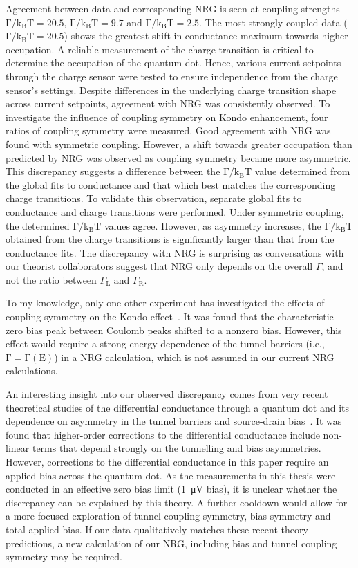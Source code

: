 Agreement between data and corresponding NRG is seen at coupling strengths $\mathrm{\Gamma/k_BT} = 20.5$, $\mathrm{\Gamma/k_BT} = 9.7$ and $\mathrm{\Gamma/k_BT} = 2.5$. The most strongly coupled data ($\mathrm{\Gamma/k_BT} = 20.5$) shows the greatest shift in conductance maximum towards higher occupation. 
A reliable measurement of the charge transition is critical to determine the occupation of the quantum dot. 
Hence, various current setpoints through the charge sensor were tested to ensure independence from the charge sensor's settings.
Despite differences in the underlying charge transition shape across current setpoints, agreement with NRG was consistently observed.
To investigate the influence of coupling symmetry on Kondo enhancement, four ratios of coupling symmetry were measured.
Good agreement with NRG was found with symmetric coupling. 
However, a shift towards greater occupation than predicted by NRG was observed as coupling symmetry became more asymmetric.
This discrepancy suggests a difference between the $\mathrm{\Gamma/k_BT}$ value determined from the global fits to conductance and that which best matches the corresponding charge transitions. 
To validate this observation, separate global fits to conductance and charge transitions were performed. Under symmetric coupling, the determined $\mathrm{\Gamma/k_BT}$ values agree. However, as asymmetry increases, the $\mathrm{\Gamma/k_BT}$ obtained from the charge transitions is significantly larger than that from the conductance fits.
The discrepancy with NRG is surprising as conversations with our theorist collaborators suggest that NRG only depends on the overall $\Gamma$, and not the ratio between $\Gamma_\mathrm{L}$ and $\Gamma_\mathrm{R}$.

To my knowledge, only one other experiment has investigated the effects of coupling symmetry on the Kondo effect~\cite{kondo_asymmetric}. 
It was found that the characteristic zero bias peak between Coulomb peaks shifted to a nonzero bias. However, this effect would require a strong energy dependence of the tunnel barriers (i.e., $\mathrm{\Gamma = \Gamma(E)}$) in a NRG calculation, which is not assumed in our current NRG calculations.

An interesting insight into our observed discrepancy comes from very recent theoretical studies of the differential conductance through a quantum dot and its dependence on asymmetry in the tunnel barriers and source-drain bias~\cite{Tsutsumi2021,kondo_nrg_asymmetric}. It was found that higher-order corrections to the differential conductance include non-linear terms that depend strongly on the tunnelling and bias asymmetries. However, corrections to the differential conductance in this paper require an applied bias across the quantum dot. As the measurements in this thesis were conducted in an effective zero bias limit (\qty{1}{\micro V} bias), it is unclear whether the discrepancy can be explained by this theory. A further cooldown would allow for a more focused exploration of tunnel coupling symmetry, bias symmetry and total applied bias. If our data qualitatively matches these recent theory predictions, a new calculation of our NRG, including bias and tunnel coupling symmetry may be required. 
 

